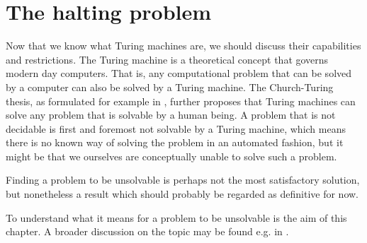 \section{The halting problem}
\label{halting_problem}

Now that we know what Turing machines are, we should discuss their capabilities and restrictions.
The Turing machine is a theoretical concept that governs modern day computers. That is, any computational problem that can be solved by a computer can also be solved by a Turing machine.
The Church-Turing thesis, as formulated for example in \cite{tur36}, further proposes that Turing machines can solve any problem that is solvable by a human being.
A problem that is not decidable is first and foremost not solvable by a Turing machine, which means there is no known way of solving the problem in an automated fashion, but it might be that we ourselves are conceptually unable to solve such a problem.

Finding a problem to be unsolvable is perhaps not the most satisfactory solution, but nonetheless a result which should probably be regarded as definitive for now.

To understand what it means for a problem to be unsolvable is the aim of this chapter.
A broader discussion on the topic may be found e.g. in \cite{sip06}.






